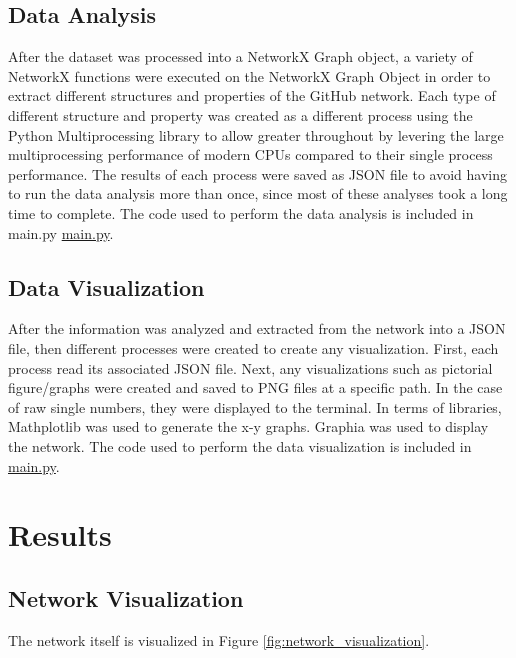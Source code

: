 \documentclass[9pt,twocolumn,twoside]{pnas-new}
\begin{document}
\subsection*{Data Analysis} After the dataset was processed into a NetworkX Graph object, a variety of NetworkX functions were executed on the NetworkX Graph Object in order to extract different structures and properties of the GitHub network. Each type of different structure and property was created as a different process using the Python Multiprocessing library to allow greater throughout by levering the large multiprocessing performance of modern CPUs compared to their single process performance. The results of each process were saved as JSON file to avoid having to run the data analysis more than once, since most of these analyses took a long time to complete. The code used to perform the data analysis is included in main.py \href{https://github.com/Hockenba/mth450-final-project-report}{main.py}.

\subsection*{Data Visualization} After the information was analyzed and extracted from the network into a JSON file, then different processes were created to create any visualization. First, each process read its associated JSON file. Next, any visualizations such as pictorial figure/graphs were created and saved to PNG files at a specific path. In the case of raw single numbers, they were displayed to the terminal. In terms of libraries, Mathplotlib was used to generate the x-y graphs. Graphia was used to display the network. The code used to perform the data visualization is included in \href{https://github.com/Hockenba/mth450-final-project-report}{main.py}.

\section*{Results}

\subsection*{Network Visualization} The network itself is visualized in Figure \ref{fig:network_visualization}.
\end{document}
